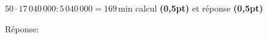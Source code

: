 \documentclass[addpoints]{exam}
\newcommand{\colSolution}{\iftoggle{question}{white}{themeColor}}
\newcommand{\sol}[2]{\iftoggle{question}{#1}{{\color{\colSolution}#2}}}
\begin{document}
\begin{questions}
\begin{parts}
\begin{solutionorgrid}[300pt]
	\vspace{5pt}
	$50 \cdot 17\,040\,000 : 5\,040\,000 = 169$\,min \hfill calcul \textbf{(0,5pt)} et réponse \textbf{(0,5pt)}
	\end{solutionorgrid}
	
\begin{tcolorbox}[enhanced jigsaw, interior hidden, colframe=box, parbox=false]%
Réponse: 
\sol{\vspace{20pt}}{Le trajet Lausanne-Zürich dure 169\,min (2h et 49 minutes).\textbf{(0,5pt)}}
\end{tcolorbox}
\end{parts}


\end{questions}
\end{document}
